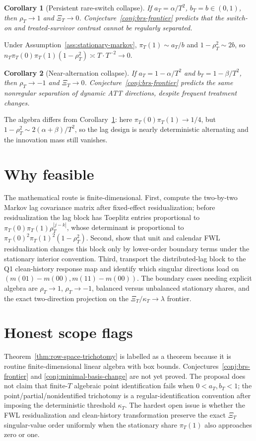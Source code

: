 \documentclass[11pt]{article}
\theoremstyle{definition}
\theoremstyle{plain}
\newtheorem{corollary}{Corollary}
\theoremstyle{remark}
\begin{document}
\begin{corollary}[Persistent rare-switch collapse]\label{cor:persistent-collapse}
If \(a_T=\alpha/T^2\), \(b_T=b\in(0,1)\), then \(\rho_T\to1\) and \(\Xi_T\to0\).
Conjecture~\ref{conj:brs-frontier} predicts that the switch-on and treated-survivor contrast cannot be regularly separated.
\end{corollary}
Under Assumption~\ref{ass:stationary-markov}, \(\pi_T(1)\sim a_T/b\) and \(1-\rho_T^2\sim2b\), so \(n_T\pi_T(0)\pi_T(1)(1-\rho_T^2)\asymp T\cdot T^{-2}\to0\).

\begin{corollary}[Near-alternation collapse]\label{cor:alternating-collapse}
If \(a_T=1-\alpha/T^2\) and \(b_T=1-\beta/T^2\), then \(\rho_T\to-1\) and \(\Xi_T\to0\).
Conjecture~\ref{conj:brs-frontier} predicts the same nonregular separation of dynamic ATT directions, despite frequent treatment changes.
\end{corollary}
The algebra differs from Corollary~\ref{cor:persistent-collapse}: here \(\pi_T(0)\pi_T(1)\to1/4\), but \(1-\rho_T^2\sim2(\alpha+\beta)/T^2\), so the lag design is nearly deterministic alternating and the innovation mass still vanishes.

\section{Why feasible}
The mathematical route is finite-dimensional.
First, compute the two-by-two Markov lag covariance matrix after fixed-effect residualization; before residualization the lag block has Toeplitz entries proportional to \(\pi_T(0)\pi_T(1)\rho_T^{|j-k|}\), whose determinant is proportional to \(\pi_T(0)^2\pi_T(1)^2(1-\rho_T^2)\).
Second, show that unit and calendar FWL residualization changes this block only by lower-order boundary terms under the stationary interior convention.
Third, transport the distributed-lag block to the Q1 clean-history response map and identify which singular directions load on \((m(01)-m(00),m(11)-m(00))\).
The boundary cases needing explicit algebra are \(\rho_T\to1\), \(\rho_T\to-1\), balanced versus unbalanced stationary shares, and the exact two-direction projection on the \(\Xi_T/\kappa_T\to\lambda\) frontier.

\section{Honest scope flags}
Theorem~\ref{thm:row-space-trichotomy} is labelled as a theorem because it is routine finite-dimensional linear algebra with box bounds.
Conjectures~\ref{conj:brs-frontier} and \ref{conj:minimal-basis-change} are not yet proved.
The proposal does not claim that finite-\(T\) algebraic point identification fails when \(0<a_T,b_T<1\); the point/partial/nonidentified trichotomy is a regular-identification convention after imposing the deterministic threshold \(\kappa_T\).
The hardest open issue is whether the FWL residualization and clean-history transformation preserve the exact \(\Xi_T\) singular-value order uniformly when the stationary share \(\pi_T(1)\) also approaches zero or one.
\end{document}
